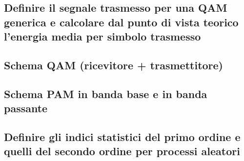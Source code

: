 \documentclass[12pt,oneside,openany]{memoir}
\numberwithin{equation}{subsection}
\begin{document}

\subsection{Definire il segnale trasmesso per una QAM generica e calcolare dal
punto di vista teorico l'energia media per simbolo trasmesso}


\subsection{Schema QAM (ricevitore + trasmettitore)}


\subsection{Schema PAM in banda base e in banda passante}


\subsection{Definire gli indici statistici del primo ordine e quelli del secondo
ordine per processi aleatori}

\end{document}
